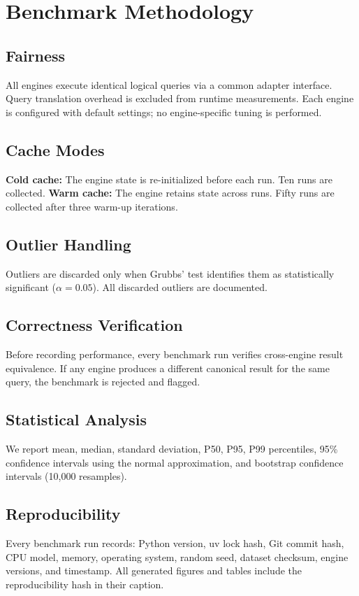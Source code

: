 \section{Benchmark Methodology}
\label{sec:methodology}

\subsection{Fairness}
All engines execute identical logical queries via a common
adapter interface.
Query translation overhead is excluded from runtime measurements.
Each engine is configured with default settings;
no engine-specific tuning is performed.

\subsection{Cache Modes}
\textbf{Cold cache:} The engine state is re-initialized before
each run. Ten runs are collected.
\textbf{Warm cache:} The engine retains state across runs.
Fifty runs are collected after three warm-up iterations.

\subsection{Outlier Handling}
Outliers are discarded only when Grubbs' test identifies them
as statistically significant ($\alpha = 0.05$).
All discarded outliers are documented.

\subsection{Correctness Verification}
Before recording performance, every benchmark run verifies
cross-engine result equivalence.
If any engine produces a different canonical result for the
same query, the benchmark is rejected and flagged.

\subsection{Statistical Analysis}
We report mean, median, standard deviation,
P50, P95, P99 percentiles,
95\% confidence intervals using the normal approximation,
and bootstrap confidence intervals (10,000 resamples).

\subsection{Reproducibility}
Every benchmark run records:
Python version, uv lock hash, Git commit hash,
CPU model, memory, operating system,
random seed, dataset checksum, engine versions,
and timestamp.
All generated figures and tables include the
reproducibility hash in their caption.
